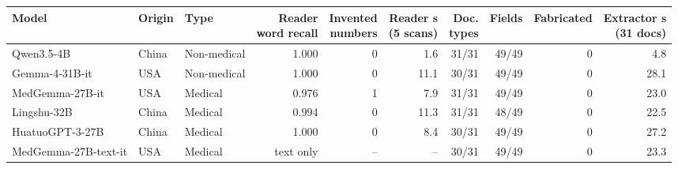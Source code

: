 \begin{tabular}{@{}lllrrrrrrr@{}}
\toprule
Model & Origin & Type & \thead{Reader\\word recall} & \thead{Invented\\numbers} & \thead{Reader s\\(5 scans)} & \thead{Doc.\\types} & Fields & Fabricated & \thead{Extractor s\\(31 docs)} \\
\midrule
Qwen3.5-4B & China & Non-medical & 1.000 & 0 & 1.6 & 31/31 & 49/49 & 0 & 4.8 \\
Gemma-4-31B-it & USA & Non-medical & 1.000 & 0 & 11.1 & 30/31 & 49/49 & 0 & 28.1 \\
MedGemma-27B-it & USA & Medical & 0.976 & 1 & 7.9 & 31/31 & 49/49 & 0 & 23.0 \\
Lingshu-32B & China & Medical & 0.994 & 0 & 11.3 & 31/31 & 48/49 & 0 & 22.5 \\
HuatuoGPT-3-27B & China & Medical & 1.000 & 0 & 8.4 & 30/31 & 49/49 & 0 & 27.2 \\
MedGemma-27B-text-it & USA & Medical & text only & -- & -- & 30/31 & 49/49 & 0 & 23.3 \\
\bottomrule
\end{tabular}
